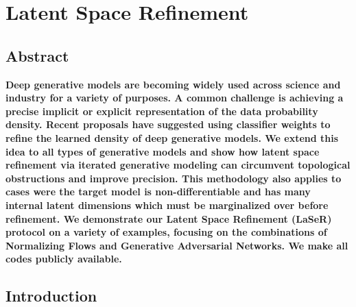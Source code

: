 %
%
%

\chapter{Latent Space Refinement}\label{chap:lsr}
\enlargethispage{2ex}
\vspace*{-2pt}

\enlargethispage{2ex}

\section*{Abstract}
{\bf Deep generative models are becoming widely used across science and industry for a variety of purposes. A common challenge is achieving a precise implicit or explicit representation of the data probability density.  Recent proposals have suggested using classifier weights to refine the learned density of deep generative models.  We extend this idea to all types of generative models and show how latent space refinement via iterated generative modeling can circumvent topological obstructions and improve precision. This methodology also applies to cases were the target model is non-differentiable and has many internal latent dimensions which must be marginalized over before refinement. We demonstrate our Latent Space Refinement (LaSeR) protocol on a variety of examples, focusing on the combinations of Normalizing Flows and Generative Adversarial Networks. We make all codes publicly available.}

\section{Introduction}
\label{sec:intro}

